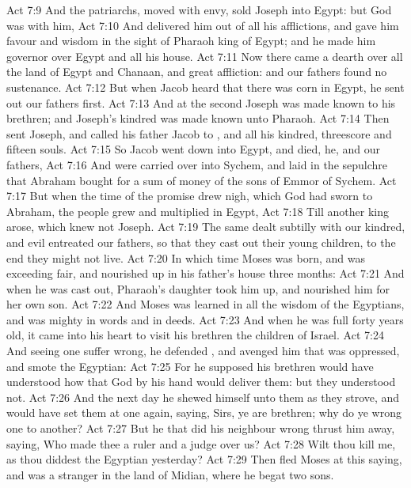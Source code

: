 \vs Act 7:9 And the patriarchs, moved with envy, sold Joseph into Egypt: but God was with him,
\vs Act 7:10 And delivered him out of all his afflictions, and gave him favour and wisdom in the sight of Pharaoh king of Egypt; and he made him governor over Egypt and all his house.
\vs Act 7:11 Now there came a dearth over all the land of Egypt and Chanaan, and great affliction: and our fathers found no sustenance.
\vs Act 7:12 But when Jacob heard that there was corn in Egypt, he sent out our fathers first.
\vs Act 7:13 And at the second  Joseph was made known to his brethren; and Joseph's kindred was made known unto Pharaoh.
\vs Act 7:14 Then sent Joseph, and called his father Jacob to , and all his kindred, threescore and fifteen souls.
\vs Act 7:15 So Jacob went down into Egypt, and died, he, and our fathers,
\vs Act 7:16 And were carried over into Sychem, and laid in the sepulchre that Abraham bought for a sum of money of the sons of Emmor  of Sychem.
\vs Act 7:17 But when the time of the promise drew nigh, which God had sworn to Abraham, the people grew and multiplied in Egypt,
\vs Act 7:18 Till another king arose, which knew not Joseph.
\vs Act 7:19 The same dealt subtilly with our kindred, and evil entreated our fathers, so that they cast out their young children, to the end they might not live.
\vs Act 7:20 In which time Moses was born, and was exceeding fair, and nourished up in his father's house three months:
\vs Act 7:21 And when he was cast out, Pharaoh's daughter took him up, and nourished him for her own son.
\vs Act 7:22 And Moses was learned in all the wisdom of the Egyptians, and was mighty in words and in deeds.
\vs Act 7:23 And when he was full forty years old, it came into his heart to visit his brethren the children of Israel.
\vs Act 7:24 And seeing one  suffer wrong, he defended , and avenged him that was oppressed, and smote the Egyptian:
\vs Act 7:25 For he supposed his brethren would have understood how that God by his hand would deliver them: but they understood not.
\vs Act 7:26 And the next day he shewed himself unto them as they strove, and would have set them at one again, saying, Sirs, ye are brethren; why do ye wrong one to another?
\vs Act 7:27 But he that did his neighbour wrong thrust him away, saying, Who made thee a ruler and a judge over us?
\vs Act 7:28 Wilt thou kill me, as thou diddest the Egyptian yesterday?
\vs Act 7:29 Then fled Moses at this saying, and was a stranger in the land of Midian, where he begat two sons.
